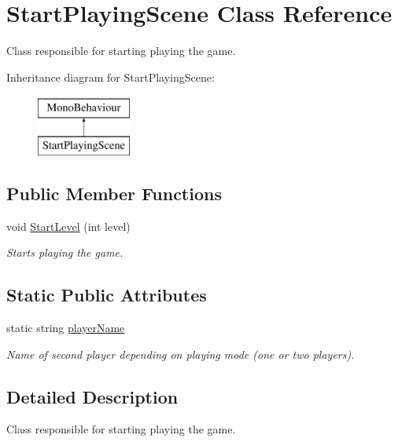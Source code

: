 \hypertarget{class_start_playing_scene}{}\section{Start\+Playing\+Scene Class Reference}
\label{class_start_playing_scene}


Class responsible for starting playing the game.  


Inheritance diagram for Start\+Playing\+Scene\+:\begin{figure}[H]
\begin{center}
\leavevmode
\includegraphics[height=2.000000cm]{class_start_playing_scene}
\end{center}
\end{figure}
\subsection*{Public Member Functions}
\begin{DoxyCompactItemize}
\item 
void \mbox{\hyperlink{class_start_playing_scene_a410c9893df6067ef27fb4fc2ce7f5394}{Start\+Level}} (int level)
\begin{DoxyCompactList}\small\item\em Starts playing the game. \end{DoxyCompactList}\end{DoxyCompactItemize}
\subsection*{Static Public Attributes}
\begin{DoxyCompactItemize}
\item 
static string \mbox{\hyperlink{class_start_playing_scene_aa349cb151f74693c91d971c2a6a20b26}{player\+Name}}
\begin{DoxyCompactList}\small\item\em Name of second player depending on playing mode (one or two players). \end{DoxyCompactList}\end{DoxyCompactItemize}


\subsection{Detailed Description}
Class responsible for starting playing the game. 



